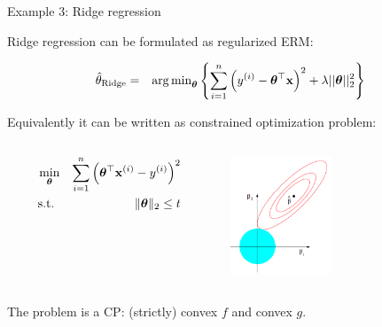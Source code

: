 \begin{vbframe}{Example 3: Ridge regression}
		
Ridge regression can be formulated as regularized ERM: 

\begin{eqnarray*}  
	\hat{\theta}_{\text{Ridge}} &=& \operatorname{arg\,min}_{\bm{\theta}} \left\{ \sum\limits_{i=1}^n \left(y^{(i)} - \bm{\theta}^\top\mathbf{x}\right)^2 + \lambda ||\bm{\theta}||_2^2 \right\}
\end{eqnarray*}

Equivalently it can be written as constrained optimization problem: 

\vspace*{-0.2cm}
\begin{columns}[T] %
	\begin{column}{.48\textwidth}
		\begin{eqnarray*}
			\min_{\bm{\theta}} && \sum_{i = 1}^n \left(\bm{\theta}^\top \mathbf{x}^{(i)} - y^{(i)}\right)^2 \\
			\text{s.t. } && \|\bm{\theta}\|_2 \le t
		\end{eqnarray*}
		
	\end{column}

	\begin{column}{.48\textwidth}
		\begin{center}
			\includegraphics[width=0.45\textwidth, keepaspectratio]{figure_man/ridge.png} 
		\end{center}
	\end{column}
\end{columns}

The problem is a CP: (strictly) convex $f$ and convex $g$.  


\end{vbframe}
	
